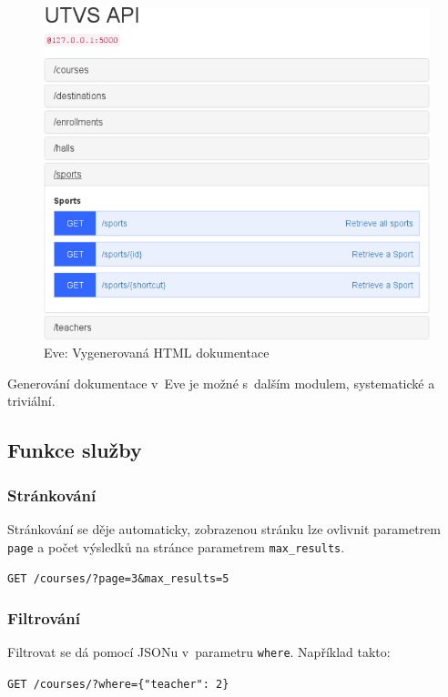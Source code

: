 \begin{figure}
\centering
\includegraphics{images/eve-docs}
\caption{Eve: Vygenerovaná HTML dokumentace \label{pic:eve-docs}}
\end{figure}

Generování dokumentace v~Eve je možné s~dalším modulem, systematické a triviální.

\subsection{Funkce služby}\label{funkce-sluux17eby}

\subsubsection*{Stránkování}\label{struxe1nkovuxe1nuxed}

Stránkování se děje automaticky, zobrazenou stránku lze ovlivnit parametrem \verb!page! a počet výsledků na stránce parametrem \verb!max_results!.

\verb!GET /courses/?page=3&max_results=5!

\subsubsection*{Filtrování}\label{filtrovuxe1nuxed}

Filtrovat se dá pomocí JSONu v~parametru \verb!where!. Například takto:

\verb!GET /courses/?where={"teacher": 2}!

